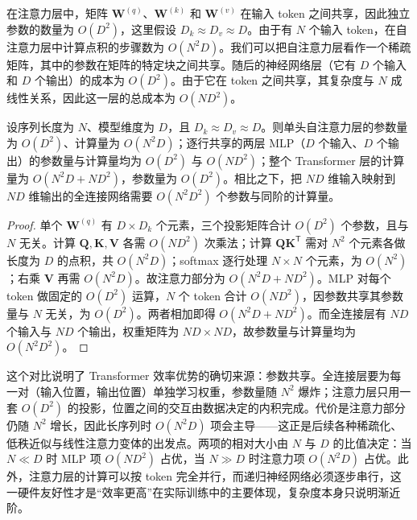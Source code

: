 \documentclass[../../main.tex]{subfiles}
\begin{document}
在注意力层中，矩阵 $\mathbf{W}^{(q)}$、$\mathbf{W}^{(k)}$ 和 $\mathbf{W}^{(v)}$ 在输入 token 之间共享，因此独立参数的数量为 $O(D^2)$，这里假设 $D_k\approx D_v\approx D$。由于有 $N$ 个输入 token，在自注意力层中计算点积的步骤数为 $O(N^2D)$。我们可以把自注意力层看作一个稀疏矩阵，其中的参数在矩阵的特定块之间共享。随后的神经网络层（它有 $D$ 个输入和 $D$ 个输出）的成本为 $O(D^2)$。由于它在 token 之间共享，其复杂度与 $N$ 成线性关系，因此这一层的总成本为 $O(ND^2)$。

\begin{proposition}\label{proposition:ch12-计算复杂度}
设序列长度为 $N$、模型维度为 $D$，且 $D_k\approx D_v\approx D$。则单头自注意力层的参数量为 $O(D^2)$、计算量为 $O(N^2D)$；逐行共享的两层 MLP（$D$ 个输入、$D$ 个输出）的参数量与计算量均为 $O(D^2)$ 与 $O(ND^2)$；整个 Transformer 层的计算量为 $O(N^2D+ND^2)$，参数量为 $O(D^2)$。相比之下，把 $ND$ 维输入映射到 $ND$ 维输出的全连接网络需要 $O(N^2D^2)$ 个参数与同阶的计算量。
\end{proposition}

\begin{proof}
单个 $\mathbf{W}^{(q)}$ 有 $D\times D_k$ 个元素，三个投影矩阵合计 $O(D^2)$ 个参数，且与 $N$ 无关。计算 $\mathbf{Q},\mathbf{K},\mathbf{V}$ 各需 $O(ND^2)$ 次乘法；计算 $\mathbf{Q}\mathbf{K}^{\mathsf{T}}$ 需对 $N^2$ 个元素各做长度为 $D$ 的点积，共 $O(N^2D)$；softmax 逐行处理 $N\times N$ 个元素，为 $O(N^2)$；右乘 $\mathbf{V}$ 再需 $O(N^2D)$。故注意力部分为 $O(N^2D+ND^2)$。MLP 对每个 token 做固定的 $O(D^2)$ 运算，$N$ 个 token 合计 $O(ND^2)$，因参数共享其参数量与 $N$ 无关，为 $O(D^2)$。两者相加即得 $O(N^2D+ND^2)$。而全连接层有 $ND$ 个输入与 $ND$ 个输出，权重矩阵为 $ND\times ND$，故参数量与计算量均为 $O(N^2D^2)$。
\end{proof}

\begin{remark}
这个对比说明了 Transformer 效率优势的确切来源：参数共享。全连接层要为每一对（输入位置，输出位置）单独学习权重，参数量随 $N^2$ 爆炸；注意力层只用一套 $O(D^2)$ 的投影，位置之间的交互由数据决定的内积完成。代价是注意力部分仍随 $N^2$ 增长，因此长序列时 $O(N^2D)$ 项会主导——这正是后续各种稀疏化、低秩近似与线性注意力变体的出发点。两项的相对大小由 $N$ 与 $D$ 的比值决定：当 $N\ll D$ 时 MLP 项 $O(ND^2)$ 占优，当 $N\gg D$ 时注意力项 $O(N^2D)$ 占优。此外，注意力层的计算可以按 token 完全并行，而递归神经网络必须逐步串行，这一硬件友好性才是“效率更高”在实际训练中的主要体现，复杂度本身只说明渐近阶。
\end{remark}
\end{document}
